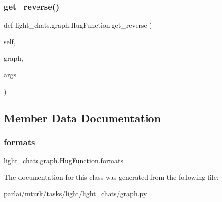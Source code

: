 \mbox{\label{classlight__chats_1_1graph_1_1HugFunction_ae028317cf500a21a8787b73ca7964e48}} 
\subsubsection{\texorpdfstring{get\+\_\+reverse()}{get\_reverse()}}
{\footnotesize\ttfamily def light\+\_\+chats.\+graph.\+Hug\+Function.\+get\+\_\+reverse (\begin{DoxyParamCaption}\item[{}]{self,  }\item[{}]{graph,  }\item[{}]{args }\end{DoxyParamCaption})}



\subsection{Member Data Documentation}
\mbox{\label{classlight__chats_1_1graph_1_1HugFunction_a9671b61b4a4c5e2d97093da92ec4a431}} 
\subsubsection{\texorpdfstring{formats}{formats}}
{\footnotesize\ttfamily light\+\_\+chats.\+graph.\+Hug\+Function.\+formats}



The documentation for this class was generated from the following file\+:\begin{DoxyCompactItemize}
\item 
parlai/mturk/tasks/light/light\+\_\+chats/\hyperlink{parlai_2mturk_2tasks_2light_2light__chats_2graph_8py}{graph.\+py}\end{DoxyCompactItemize}
